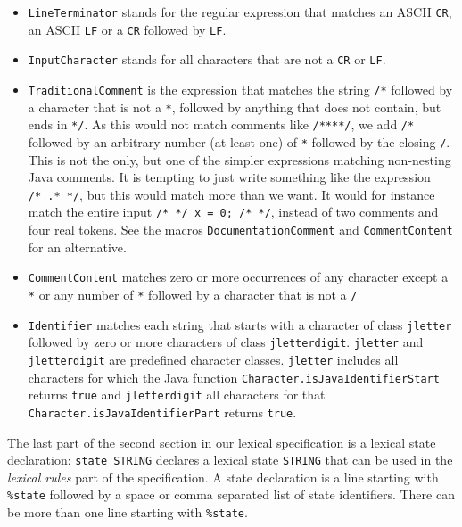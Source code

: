 \begin{itemize}
\item
  \texttt{LineTerminator} stands for the regular expression that matches
  an ASCII \texttt{CR}, an ASCII \texttt{LF} or a \texttt{CR} followed
  by \texttt{LF}.
\item
  \texttt{InputCharacter} stands for all characters that are not a
  \texttt{CR} or \texttt{LF}.
\item
  \texttt{TraditionalComment} is the expression that matches the string
  \texttt{/*} followed by a character that is not a \texttt{*}, followed
  by anything that does not contain, but ends in \texttt{*/}. As this
  would not match comments like \texttt{/****/}, we add \texttt{/*}
  followed by an arbitrary number (at least one) of \texttt{*} followed
  by the closing \texttt{/}. This is not the only, but one of the
  simpler expressions matching non-nesting Java comments. It is tempting
  to just write something like the expression \texttt{/*\ .*\ */}, but
  this would match more than we want. It would for instance match the
  entire input \texttt{/*\ */\ x\ =\ 0;\ /*\ */}, instead of two
  comments and four real tokens. See the macros
  \texttt{DocumentationComment} and \texttt{CommentContent} for an
  alternative.
\item
  \texttt{CommentContent} matches zero or more occurrences of any
  character except a \texttt{*} or any number of \texttt{*} followed by
  a character that is not a \texttt{/}
\item
  \texttt{Identifier} matches each string that starts with a character
  of class \texttt{jletter} followed by zero or more characters of class
  \texttt{jletterdigit}. \texttt{jletter} and \texttt{jletterdigit} are
  predefined character classes. \texttt{jletter} includes all characters
  for which the Java function \texttt{Character.isJavaIdentifierStart}
  returns \texttt{true} and \texttt{jletterdigit} all characters for
  that \texttt{Character.isJavaIdentifierPart} returns \texttt{true}.
\end{itemize}

The last part of the second section in our lexical specification is a
lexical state declaration: \texttt{state\ STRING} declares a lexical
state \texttt{STRING} that can be used in the \emph{lexical rules} part
of the specification. A state declaration is a line starting with
\texttt{\%state} followed by a space or comma separated list of state
identifiers. There can be more than one line starting with
\texttt{\%state}.

